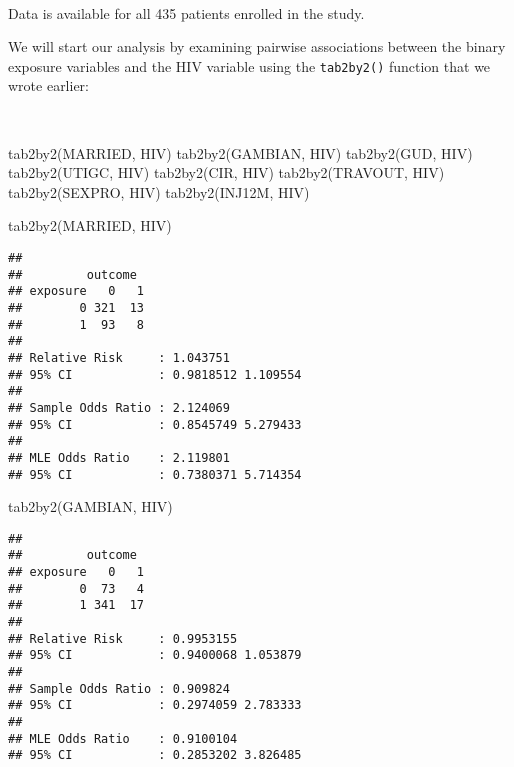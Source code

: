 \documentclass[
  12pt,
  a4paper]{book}
\newenvironment{Shaded}{\begin{snugshade}}{\end{snugshade}}
\newcommand{\FunctionTok}[1]{\textcolor[rgb]{0.00,0.00,0.00}{#1}}
\newcommand{\NormalTok}[1]{#1}
\begin{document}
~

Data is available for all 435 patients enrolled in the study.

We will start our analysis by examining pairwise associations between the binary exposure variables and the
HIV variable using the \texttt{tab2by2()} function that we wrote earlier:

~

\begin{Shaded}
\begin{Highlighting}[]
\FunctionTok{tab2by2}\NormalTok{(MARRIED, HIV)}
\FunctionTok{tab2by2}\NormalTok{(GAMBIAN, HIV)}
\FunctionTok{tab2by2}\NormalTok{(GUD, HIV)}
\FunctionTok{tab2by2}\NormalTok{(UTIGC, HIV)}
\FunctionTok{tab2by2}\NormalTok{(CIR, HIV)}
\FunctionTok{tab2by2}\NormalTok{(TRAVOUT, HIV)}
\FunctionTok{tab2by2}\NormalTok{(SEXPRO, HIV)}
\FunctionTok{tab2by2}\NormalTok{(INJ12M, HIV)}
\end{Highlighting}
\end{Shaded}

\newpage

\begin{Shaded}
\begin{Highlighting}[]
\FunctionTok{tab2by2}\NormalTok{(MARRIED, HIV)}
\end{Highlighting}
\end{Shaded}

\begin{verbatim}
## 
##         outcome
## exposure   0   1
##        0 321  13
##        1  93   8
## 
## Relative Risk     : 1.043751 
## 95% CI            : 0.9818512 1.109554 
## 
## Sample Odds Ratio : 2.124069 
## 95% CI            : 0.8545749 5.279433 
## 
## MLE Odds Ratio    : 2.119801 
## 95% CI            : 0.7380371 5.714354
\end{verbatim}

\begin{Shaded}
\begin{Highlighting}[]
\FunctionTok{tab2by2}\NormalTok{(GAMBIAN, HIV)}
\end{Highlighting}
\end{Shaded}

\begin{verbatim}
## 
##         outcome
## exposure   0   1
##        0  73   4
##        1 341  17
## 
## Relative Risk     : 0.9953155 
## 95% CI            : 0.9400068 1.053879 
## 
## Sample Odds Ratio : 0.909824 
## 95% CI            : 0.2974059 2.783333 
## 
## MLE Odds Ratio    : 0.9100104 
## 95% CI            : 0.2853202 3.826485
\end{verbatim}
\end{document}
